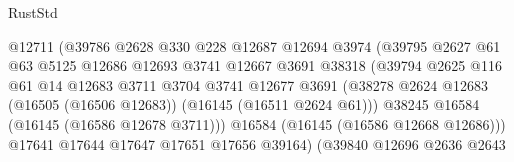 \begin{lexlean}{RustStd}
\begin{coremodule}
                                        @12711
                                        (@39786
                                          @2628
                                          @330
                                          @228
                                          @12687
                                          @12694
                                          @3974
                                          (@39795
                                            @2627
                                            @61
                                            @63
                                            @5125
                                            @12686
                                            @12693
                                            @3741
                                            @12667
                                            @3691
                                            @38318
                                            (@39794
                                              @2625
                                              @116
                                              @61
                                              @14
                                              @12683
                                              @3711
                                              @3704
                                              @3741
                                              @12677
                                              @3691
                                              (@38278
                                                @2624
                                                @12683
                                                (@16505 (@16506 @12683))
                                                (@16145 (@16511 @2624 @61)))
                                              @38245
                                              @16584
                                              (@16145 (@16586 @12678 @3711)))
                                            @16584
                                            (@16145 (@16586 @12668 @12686)))
                                          @17641
                                          @17644
                                          @17647
                                          @17651
                                          @17656
                                          @39164)
                                        (@39840
                                          @12696
                                          @2636
                                          @2643

\end{coremodule}
\end{lexlean}
